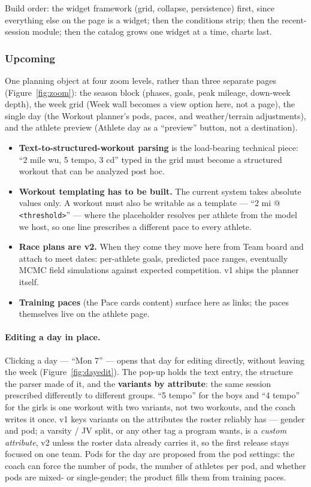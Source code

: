 \documentclass[11pt]{article}
\newcommand{\code}[1]{\texttt{\small #1}}
\begin{document}
Build order: the widget framework (grid, collapse, persistence) first, since
everything else on the page is a widget; then the conditions strip; then the
recent-session module; then the catalog grows one widget at a time, charts
last.

\subsubsection{Upcoming}

One planning object at four zoom levels, rather than three separate pages
(Figure~\ref{fig:zoom}): the season block (phases, goals, peak mileage,
down-week depth), the week grid (Week
wall becomes a view option here, not a page), the single day (the Workout
planner's pods, paces, and weather/terrain adjustments), and the athlete
preview (Athlete day as a ``preview'' button, not a destination).

\begin{itemize}
  \item \textbf{Text-to-structured-workout parsing} is the load-bearing
    technical piece: ``2 mile wu, 5 tempo, 3 cd'' typed in the grid must
    become a structured workout that can be analyzed post hoc.
  \item \textbf{Workout templating has to be built.} The current system
    takes absolute values only. A workout must also be writable as a
    template --- ``2 mi @ \code{<threshold>}'' --- where the placeholder
    resolves per athlete from the model we host, so one line prescribes a
    different pace to every athlete.
  \item \textbf{Race plans are v2.} When they come they move here from Team
    board and attach to meet dates: per-athlete goals, predicted pace ranges,
    eventually MCMC field simulations against expected competition. v1 ships
    the planner itself.
  \item \textbf{Training paces} (the Pace cards content) surface here as
    links; the paces themselves live on the athlete page.
\end{itemize}

\paragraph{Editing a day in place.} Clicking a day --- ``Mon 7'' --- opens that
day for editing directly, without leaving the week (Figure~\ref{fig:dayedit}).
The pop-up holds the text entry, the structure the parser made of it, and the
\textbf{variants by attribute}: the same session prescribed differently to
different groups. ``5 tempo'' for the boys and ``4 tempo'' for the girls is
one workout with two variants, not two workouts, and the coach writes it
once. v1 keys variants on the attributes the roster reliably has --- gender
and pod; a varsity / JV split, or any other tag a program wants, is a
\emph{custom attribute}, v2 unless the roster data already carries it, so
the first release stays focused on one team. Pods for the day are proposed
from the pod settings: the coach can force the number of pods, the number of
athletes per pod, and whether pods are mixed- or single-gender; the product
fills them from training paces.
\end{document}
